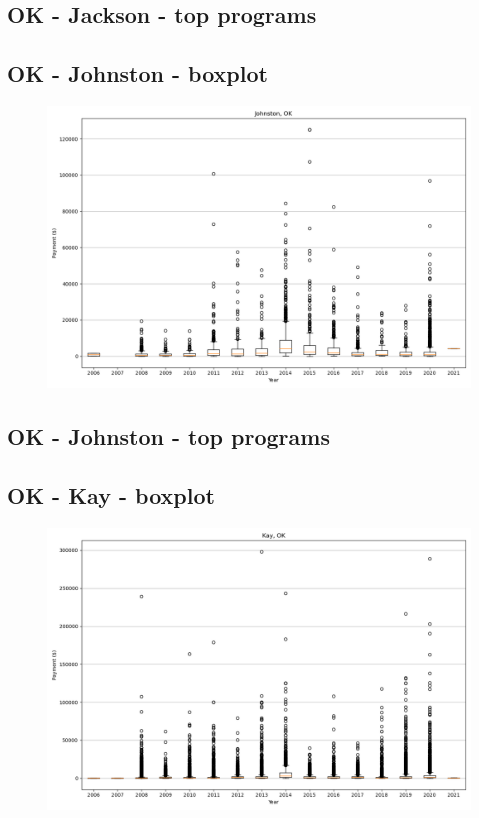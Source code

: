 \subsection*{OK - Jackson - top programs}

\newpage
\subsection*{OK - Johnston - boxplot}
\begin{figure}[h]
\centering
\includegraphics[width=7in]{../output/boxplots/counties/Johnston-OK_boxplot.png}
\end{figure}


\subsection*{OK - Johnston - top programs}

\newpage
\subsection*{OK - Kay - boxplot}
\begin{figure}[h]
\centering
\includegraphics[width=7in]{../output/boxplots/counties/Kay-OK_boxplot.png}
\end{figure}


